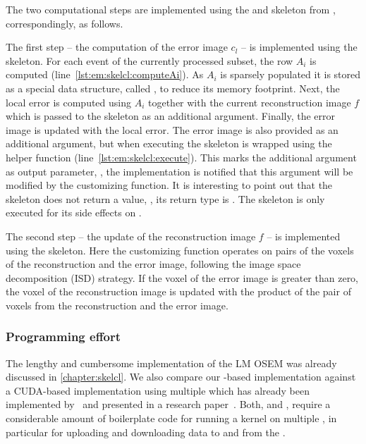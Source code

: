 The two computational steps are implemented using the \map and \zip skeleton from \SkelCL, correspondingly, as follows.

The first step -- the computation of the error image $c_l$ -- is implemented using the \map skeleton.
For each event  of the currently processed subset, the row $A_i$ is computed (line~\ref{lst:em:skelcl:computeAi}).
As $A_i$ is sparsely populated it is stored as a special data structure, called , to reduce its memory footprint.
Next, the local error is computed using $A_i$ together with the current reconstruction image $f$ which is passed to the \map skeleton as an additional argument.
Finally, the error image  is updated with the local error.
The error image is also provided as an additional argument, but when executing the \map skeleton  is wrapped using the  helper function (line~\ref{lst:em:skelcl:execute}).
This marks the additional argument as output parameter, \ie, the \SkelCL implementation is notified that this argument will be modified by the customizing function.
It is interesting to point out that the \map skeleton does not return a value, \ie, its return type is .
The skeleton is only executed for its side effects on .

The second step -- the update of the reconstruction image $f$ -- is implemented using the \zip skeleton.
Here the customizing function operates on pairs of the voxels of the reconstruction and the error image, following the image space decomposition (ISD) strategy.
If the voxel of the error image is greater than zero, the voxel of the reconstruction image is updated with the product of the pair of voxels from the reconstruction and the error image.







\subsubsection*{Programming effort}
The lengthy and cumbersome \OpenCL implementation of the LM OSEM was already discussed in \autoref{chapter:skelcl}.
We also compare our \SkelCL-based implementation against a CUDA-based implementation using multiple \GPUs which has already been implemented by~\citeauthor{SchellmannGoMeKoScWuBu2009} and presented in a research paper~\cite{SchellmannGoMeKoScWuBu2009}.
Both, \CUDA and \OpenCL, require a considerable amount of boilerplate code for running a kernel on multiple \GPUs, in particular for uploading and downloading data to and from the \GPUs.

